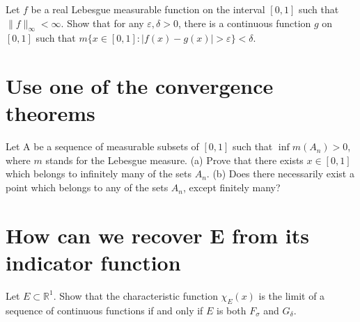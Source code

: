 \documentclass[lang=cn,11pt]{elegantbook}
\begin{document}
Let $f$ be a real Lebesgue measurable function on the interval $[0,1]$ such that $\|f\|_{\infty}<\infty$. Show that for any $\varepsilon, \delta>0$, there is a continuous function $g$ on $[0,1]$ such that $m\{x \in[0,1]:|f(x)-g(x)|>\varepsilon\}<\delta$.
\newline
\newline
\newline
\newline
\newline
\newline
\newline
\newline
\newline




\section{Use one of the convergence theorems}
Let A be a sequence of measurable subsets of $[0,1]$ such that $\inf m\left(A_n\right)>0$, where $m$ stands for the Lebesgue measure.
(a) Prove that there exists $x \in[0,1]$ which belongs to infinitely many of the sets $A_n$.
(b) Does there necessarily exist a point which belongs to any of the sets $A_n$, except finitely many? \newline
\newline
\newline
\newline
\newline
\newline
\newline
\newline
\newline








\section{How can we recover E from its indicator function}
Let $E \subset \mathbb{R}^1$. Show that the characteristic function $\chi_E(x)$ is the limit of a sequence of continuous functions if and only if $E$ is both $F_\sigma$ and $G_\delta$.\newline
\newline
\newline
\newline
\newline
\newline
\newline
\newline
\newline
\end{document}
